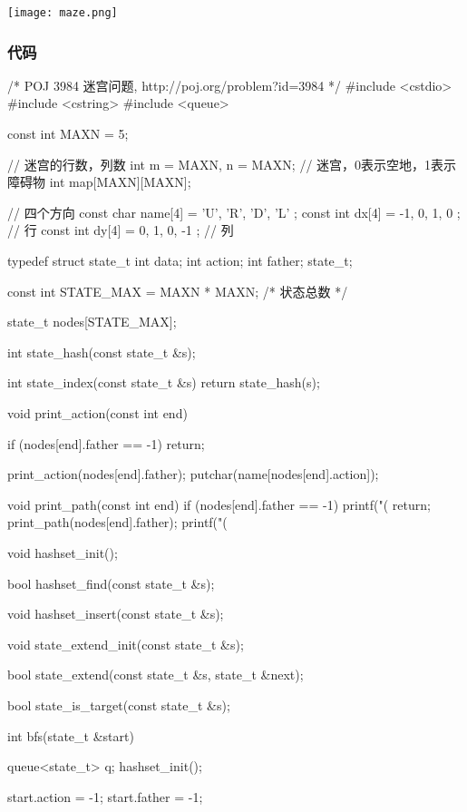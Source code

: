\begin{center}
\texttt{[image: maze.png]}\\
\label{fig:maze}
\end{center}

\subsubsection{代码}
\begin{Codex}[label=maze.c]
/* POJ 3984 迷宫问题, http://poj.org/problem?id=3984 */
#include <cstdio>
#include <cstring>
#include <queue>

const int MAXN = 5;

// 迷宫的行数，列数
int m = MAXN, n = MAXN;
// 迷宫，0表示空地，1表示障碍物
int map[MAXN][MAXN];

// 四个方向
const char name[4] = { 'U', 'R', 'D', 'L' };
const int dx[4] = { -1, 0, 1, 0 }; // 行
const int dy[4] = { 0, 1, 0, -1 }; // 列


typedef struct state_t {
    int data;
    int action;
    int father;
} state_t;

const int STATE_MAX = MAXN * MAXN;  /* 状态总数 */

state_t nodes[STATE_MAX];

int state_hash(const state_t &s);

int state_index(const state_t &s) {
    return state_hash(s);
}

void print_action(const int end) {
    if (nodes[end].father == -1) return;

    print_action(nodes[end].father);
    putchar(name[nodes[end].action]);
}

void print_path(const int end) {
    if (nodes[end].father == -1) {
        printf("(%
        return;
    }
    print_path(nodes[end].father);
    printf("(%
}

void hashset_init();

bool hashset_find(const state_t &s);

void hashset_insert(const state_t &s);

void state_extend_init(const state_t &s);

bool state_extend(const state_t &s, state_t &next);

bool state_is_target(const state_t &s);

int bfs(state_t &start) {
    queue<state_t> q;
    hashset_init();

    start.action = -1;
    start.father = -1;

}
\end{Codex}
